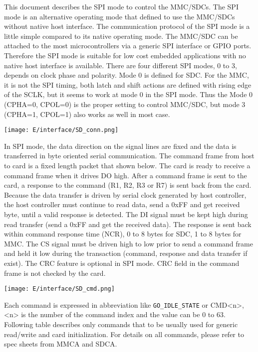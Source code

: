 \secdown

This document describes the SPI mode to control the MMC/SDCs. The SPI mode is an
alternative operating mode that defined to use the MMC/SDCs without native host
interface. The communication protocol of the SPI mode is a little simple
compared to its native operating mode. The MMC/SDC can be attached to the most
microcontrollers via a generic SPI interface or GPIO ports. Therefore the SPI
mode is suitable for low cost embedded applications with no native host
interface is available. There are four different SPI modes, 0 to 3, depends on
clock phase and polarity. Mode 0 is defined for SDC. For the MMC, it is not the
SPI timing, both latch and shift actions are defined with rising edge of the
SCLK, but it seems to work at mode 0 in the SPI mode. Thus the Mode 0 (CPHA=0,
CPOL=0) is the proper setting to control MMC/SDC, but mode 3 (CPHA=1, CPOL=1)
also works as well in most case.

\bigskip
\texttt{[image: E/interface/SD\_conn.png]}
\bigskip


In SPI mode, the data direction on the signal lines are fixed and the data is
transferred in byte oriented serial communication. The command frame from host
to card is a fixed length packet that shown below. The card is ready to receive
a command frame when it drives DO high. After a command frame is sent to the
card, a response to the command (R1, R2, R3 or R7) is sent back from the card.
Because the data transfer is driven by serial clock generated by host
controller, the host controller must continue to read data, send a 0xFF and get
received byte, until a valid response is detected. The DI signal must be kept
high during read transfer (send a 0xFF and get the received data). The response
is sent back within command response time (NCR), 0 to 8 bytes for SDC, 1 to 8
bytes for MMC. The CS signal must be driven high to low prior to send a command
frame and held it low during the transaction (command, response and data
transfer if exist). The CRC feature is optional in SPI mode. CRC field in the
command frame is not checked by the card.

\bigskip
\noindent\texttt{[image: E/interface/SD\_cmd.png]}
\bigskip


Each command is expressed in abbreviation like \verb|GO_IDLE_STATE| or CMD<n>,
<n> is the number of the command index and the value can be 0 to 63. Following table
describes only commands that to be usually used for generic read/write and card
initialization. For details on all commands, please refer to spec sheets from
MMCA and SDCA.

